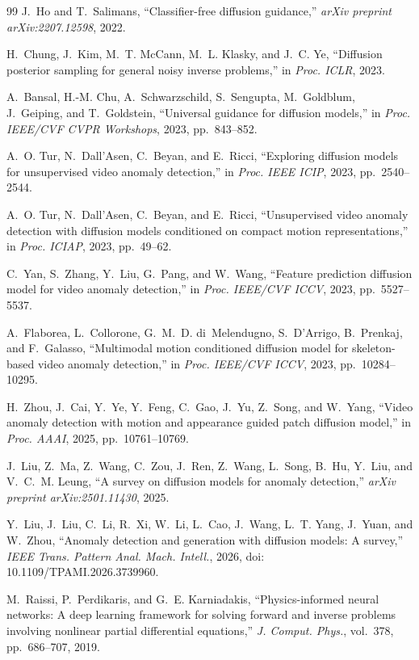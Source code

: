 \documentclass[11pt,a4paper]{article}
\begin{document}
\begin{thebibliography}{99}
J.~Ho and T.~Salimans, ``Classifier-free diffusion guidance,'' \emph{arXiv preprint arXiv:2207.12598}, 2022.

H.~Chung, J.~Kim, M.~T. McCann, M.~L. Klasky, and J.~C. Ye, ``Diffusion posterior sampling for general noisy inverse problems,'' in \emph{Proc. ICLR}, 2023.

A.~Bansal, H.-M. Chu, A.~Schwarzschild, S.~Sengupta, M.~Goldblum, J.~Geiping, and T.~Goldstein, ``Universal guidance for diffusion models,'' in \emph{Proc. IEEE/CVF CVPR Workshops}, 2023, pp.~843--852.

A.~O. Tur, N.~Dall'Asen, C.~Beyan, and E.~Ricci, ``Exploring diffusion models for unsupervised video anomaly detection,'' in \emph{Proc. IEEE ICIP}, 2023, pp.~2540--2544.

A.~O. Tur, N.~Dall'Asen, C.~Beyan, and E.~Ricci, ``Unsupervised video anomaly detection with diffusion models conditioned on compact motion representations,'' in \emph{Proc. ICIAP}, 2023, pp.~49--62.

C.~Yan, S.~Zhang, Y.~Liu, G.~Pang, and W.~Wang, ``Feature prediction diffusion model for video anomaly detection,'' in \emph{Proc. IEEE/CVF ICCV}, 2023, pp.~5527--5537.

A.~Flaborea, L.~Collorone, G.~M.~D. di~Melendugno, S.~D'Arrigo, B.~Prenkaj, and F.~Galasso, ``Multimodal motion conditioned diffusion model for skeleton-based video anomaly detection,'' in \emph{Proc. IEEE/CVF ICCV}, 2023, pp.~10284--10295.

H.~Zhou, J.~Cai, Y.~Ye, Y.~Feng, C.~Gao, J.~Yu, Z.~Song, and W.~Yang, ``Video anomaly detection with motion and appearance guided patch diffusion model,'' in \emph{Proc. AAAI}, 2025, pp.~10761--10769.

J.~Liu, Z.~Ma, Z.~Wang, C.~Zou, J.~Ren, Z.~Wang, L.~Song, B.~Hu, Y.~Liu, and V.~C.~M. Leung, ``A survey on diffusion models for anomaly detection,'' \emph{arXiv preprint arXiv:2501.11430}, 2025.

Y.~Liu, J.~Liu, C.~Li, R.~Xi, W.~Li, L.~Cao, J.~Wang, L.~T. Yang, J.~Yuan, and W.~Zhou, ``Anomaly detection and generation with diffusion models: A survey,'' \emph{IEEE Trans. Pattern Anal. Mach. Intell.}, 2026, doi: 10.1109/TPAMI.2026.3739960.

M.~Raissi, P.~Perdikaris, and G.~E. Karniadakis, ``Physics-informed neural networks: A deep learning framework for solving forward and inverse problems involving nonlinear partial differential equations,'' \emph{J. Comput. Phys.}, vol.~378, pp.~686--707, 2019.


\end{thebibliography}
\end{document}
